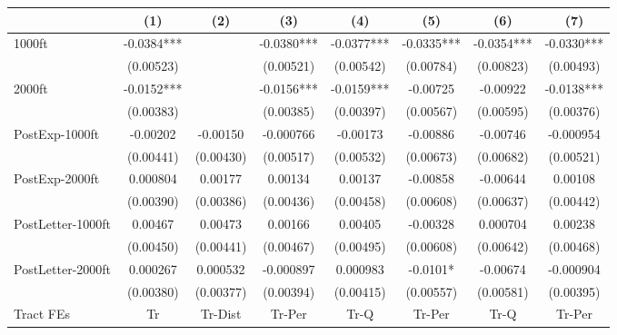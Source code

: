 {
\def\sym#1{\ifmmode^{#1}\else\(^{#1}\)\fi}
\begin{tabular}{l*{7}{c}}
\toprule
                    &\multicolumn{1}{c}{(1)}   &\multicolumn{1}{c}{(2)}   &\multicolumn{1}{c}{(3)}   &\multicolumn{1}{c}{(4)}   &\multicolumn{1}{c}{(5)}   &\multicolumn{1}{c}{(6)}   &\multicolumn{1}{c}{(7)}   \\
\midrule
1000ft              &     -0.0384***&               &     -0.0380***&     -0.0377***&     -0.0335***&     -0.0354***&     -0.0330***\\
                    &   (0.00523)   &               &   (0.00521)   &   (0.00542)   &   (0.00784)   &   (0.00823)   &   (0.00493)   \\
\addlinespace
2000ft              &     -0.0152***&               &     -0.0156***&     -0.0159***&    -0.00725   &    -0.00922   &     -0.0138***\\
                    &   (0.00383)   &               &   (0.00385)   &   (0.00397)   &   (0.00567)   &   (0.00595)   &   (0.00376)   \\
\addlinespace
PostExp-1000ft      &    -0.00202   &    -0.00150   &   -0.000766   &    -0.00173   &    -0.00886   &    -0.00746   &   -0.000954   \\
                    &   (0.00441)   &   (0.00430)   &   (0.00517)   &   (0.00532)   &   (0.00673)   &   (0.00682)   &   (0.00521)   \\
\addlinespace
PostExp-2000ft      &    0.000804   &     0.00177   &     0.00134   &     0.00137   &    -0.00858   &    -0.00644   &     0.00108   \\
                    &   (0.00390)   &   (0.00386)   &   (0.00436)   &   (0.00458)   &   (0.00608)   &   (0.00637)   &   (0.00442)   \\
\addlinespace
PostLetter-1000ft   &     0.00467   &     0.00473   &     0.00166   &     0.00405   &    -0.00328   &    0.000704   &     0.00238   \\
                    &   (0.00450)   &   (0.00441)   &   (0.00467)   &   (0.00495)   &   (0.00608)   &   (0.00642)   &   (0.00468)   \\
\addlinespace
PostLetter-2000ft   &    0.000267   &    0.000532   &   -0.000897   &    0.000983   &     -0.0101*  &    -0.00674   &   -0.000904   \\
                    &   (0.00380)   &   (0.00377)   &   (0.00394)   &   (0.00415)   &   (0.00557)   &   (0.00581)   &   (0.00395)   \\
\midrule
Tract FEs           &          Tr   &     Tr-Dist   &      Tr-Per   &        Tr-Q   &      Tr-Per   &        Tr-Q   &      Tr-Per   \\

\end{tabular}}
